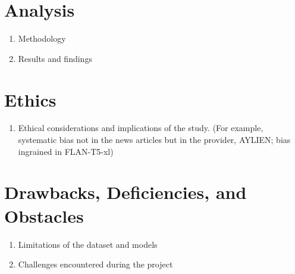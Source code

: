 \documentclass[11pt]{article}
\begin{document}
\section{Analysis}

\vspace{.1in}

\begin{enumerate}
    \item Methodology
    \item Results and findings
\end{enumerate}


\section{Ethics}

\vspace{.1in}

\begin{enumerate}
    \item Ethical considerations and implications of the study. (For example, systematic bias not in the news articles but in the provider, AYLIEN; bias ingrained in FLAN-T5-xl)
\end{enumerate}


\section{Drawbacks, Deficiencies, and Obstacles}

\vspace{.1in}

\begin{enumerate}
    \item Limitations of the dataset and models
    \item Challenges encountered during the project
\end{enumerate}

\end{document}
